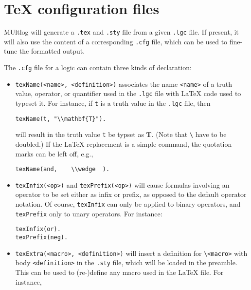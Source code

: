 \documentclass[]{article}
\begin{document}
\hypertarget{tex-configuration-files}{%
\section{TeX configuration files}\label{tex-configuration-files}}

MUltlog will generate a \texttt{.tex} and \texttt{.sty} file from a
given \texttt{.lgc} file. If present, it will also use the content of a
corresponding \texttt{.cfg} file, which can be used to fine-tune the
formatted output.

The \texttt{.cfg} file for a logic can contain three kinds of
declaration:

\begin{itemize}
\item
  \texttt{texName(\textless{}name\textgreater{},\ \textless{}definition\textgreater{})}
  associates the name \texttt{\textless{}name\textgreater{}} of a truth
  value, operator, or quantifier used in the \texttt{.lgc} file with
  LaTeX code used to typeset it. For instance, if \texttt{t} is a truth
  value in the \texttt{.lgc} file, then

\begin{verbatim}
texName(t, "\\mathbf{T}").
\end{verbatim}

  will result in the truth value \texttt{t} be typset as \(\mathbf{T}\).
  (Note that \texttt{\textbackslash{}} have to be doubled.) If the LaTeX
  replacement is a simple command, the quotation marks can be left off,
  e.g.,

\begin{verbatim}
texName(and,    \\wedge  ).
\end{verbatim}
\item
  \texttt{texInfix(\textless{}op\textgreater{})} and
  \texttt{texPrefix(\textless{}op\textgreater{})} will cause formulas
  involving an operator to be set either as infix or prefix, as opposed
  to the default operator notation. Of course, \texttt{texInfix} can
  only be applied to binary operators, and \texttt{texPrefix} only to
  unary operators. For instance:

\begin{verbatim}
texInfix(or).
texPrefix(neg).
\end{verbatim}
\item
  \texttt{texExtra(\textless{}macro\textgreater{},\ \textless{}definition\textgreater{})}
  will insert a definition for
  \texttt{\textbackslash{}\textless{}macro\textgreater{}} with body
  \texttt{\textless{}definition\textgreater{}} in the \texttt{.sty}
  file, which will be loaded in the preamble. This can be used to
  (re-)define any macro used in the LaTeX file. For instance,


\end{itemize}
\end{document}
